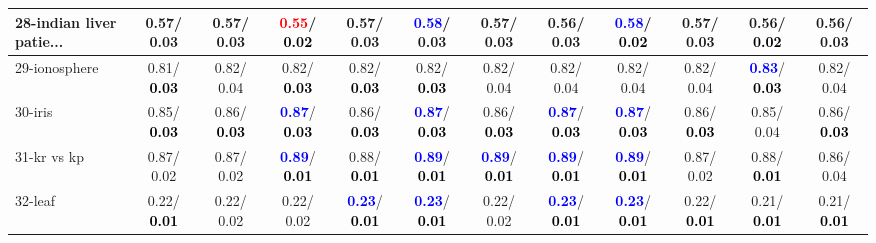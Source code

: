 \begin{table}[h]
\begin{center}
{\begin{tabular}{lc|c|c|c|c|c|c|c|c|c|c}
28-indian liver patie... &   0.57/  0.03 &   0.57/  0.03 & \textcolor{red}{\textbf{  0.55}}/\textcolor{black}{\textbf{  0.02}} &   0.57/  0.03 & \textcolor{blue}{\textbf{  0.58}}/  0.03 &   0.57/  0.03 &   0.56/  0.03 & \textcolor{blue}{\textbf{  0.58}}/\textcolor{black}{\textbf{  0.02}} &   0.57/  0.03 &   0.56/\textcolor{black}{\textbf{  0.02}} &   0.56/  0.03 \\ \hline
29-ionosphere &   0.81/\textcolor{black}{\textbf{  0.03}} &   0.82/  0.04 &   0.82/\textcolor{black}{\textbf{  0.03}} &   0.82/\textcolor{black}{\textbf{  0.03}} &   0.82/\textcolor{black}{\textbf{  0.03}} &   0.82/  0.04 &   0.82/  0.04 &   0.82/  0.04 &   0.82/  0.04 & \textcolor{blue}{\textbf{  0.83}}/\textcolor{black}{\textbf{  0.03}} &   0.82/  0.04 \\
30-iris &   0.85/\textcolor{black}{\textbf{  0.03}} &   0.86/\textcolor{black}{\textbf{  0.03}} & \textcolor{blue}{\textbf{  0.87}}/\textcolor{black}{\textbf{  0.03}} &   0.86/\textcolor{black}{\textbf{  0.03}} & \textcolor{blue}{\textbf{  0.87}}/\textcolor{black}{\textbf{  0.03}} &   0.86/\textcolor{black}{\textbf{  0.03}} & \textcolor{blue}{\textbf{  0.87}}/\textcolor{black}{\textbf{  0.03}} & \textcolor{blue}{\textbf{  0.87}}/\textcolor{black}{\textbf{  0.03}} &   0.86/\textcolor{black}{\textbf{  0.03}} &   0.85/  0.04 &   0.86/\textcolor{black}{\textbf{  0.03}} \\
31-kr vs kp &   0.87/  0.02 &   0.87/  0.02 & \textcolor{blue}{\textbf{  0.89}}/\textcolor{black}{\textbf{  0.01}} &   0.88/\textcolor{black}{\textbf{  0.01}} & \textcolor{blue}{\textbf{  0.89}}/\textcolor{black}{\textbf{  0.01}} & \textcolor{blue}{\textbf{  0.89}}/\textcolor{black}{\textbf{  0.01}} & \textcolor{blue}{\textbf{  0.89}}/\textcolor{black}{\textbf{  0.01}} & \textcolor{blue}{\textbf{  0.89}}/\textcolor{black}{\textbf{  0.01}} &   0.87/  0.02 &   0.88/\textcolor{black}{\textbf{  0.01}} &   0.86/  0.04 \\
32-leaf &   0.22/\textcolor{black}{\textbf{  0.01}} &   0.22/  0.02 &   0.22/  0.02 & \textcolor{blue}{\textbf{  0.23}}/\textcolor{black}{\textbf{  0.01}} & \textcolor{blue}{\textbf{  0.23}}/\textcolor{black}{\textbf{  0.01}} &   0.22/  0.02 & \textcolor{blue}{\textbf{  0.23}}/\textcolor{black}{\textbf{  0.01}} & \textcolor{blue}{\textbf{  0.23}}/\textcolor{black}{\textbf{  0.01}} &   0.22/\textcolor{black}{\textbf{  0.01}} &   0.21/\textcolor{black}{\textbf{  0.01}} &   0.21/\textcolor{black}{\textbf{  0.01}} \\\end{tabular}
}\label{strats0aC4.5w}
\end{center}
\end{table}
